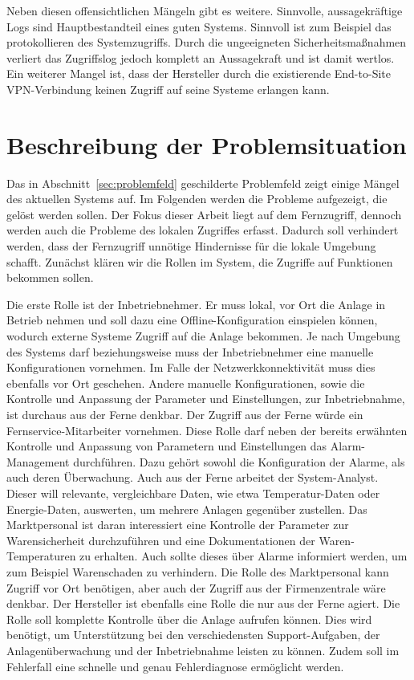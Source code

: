 \documentclass[11pt,a4paper]{report}
\begin{document}
Neben diesen offensichtlichen Mängeln gibt es weitere. Sinnvolle, aussagekräftige Logs sind Hauptbestandteil eines guten Systems. Sinnvoll ist zum Beispiel das protokollieren des Systemzugriffs. Durch die ungeeigneten Sicherheitsmaßnahmen verliert das Zugriffslog jedoch komplett an Aussagekraft und ist damit wertlos. Ein weiterer Mangel ist, dass der Hersteller durch die existierende End-to-Site VPN-Verbindung keinen Zugriff auf seine Systeme erlangen kann. 


\section{Beschreibung der Problemsituation}

Das in Abschnitt~\ref{sec:problemfeld} geschilderte Problemfeld zeigt einige Mängel des aktuellen Systems auf. Im Folgenden werden die Probleme aufgezeigt, die gelöst werden sollen. Der Fokus dieser Arbeit liegt auf dem Fernzugriff, dennoch werden auch die Probleme des lokalen Zugriffes erfasst. Dadurch soll verhindert werden, dass der Fernzugriff unnötige Hindernisse für die lokale Umgebung schafft. 
Zunächst klären wir die Rollen im System, die Zugriffe auf Funktionen bekommen sollen. 

Die erste Rolle ist der Inbetriebnehmer. Er muss lokal, vor Ort die Anlage in Betrieb nehmen und soll dazu eine Offline-Konfiguration einspielen können, wodurch externe Systeme Zugriff auf die Anlage bekommen. Je nach Umgebung des Systems darf beziehungsweise muss der Inbetriebnehmer eine manuelle Konfigurationen vornehmen. Im Falle der Netzwerkkonnektivität muss dies ebenfalls vor Ort geschehen. Andere manuelle Konfigurationen, sowie die Kontrolle und Anpassung der Parameter und Einstellungen, zur Inbetriebnahme, ist durchaus aus der Ferne denkbar. Der Zugriff aus der Ferne würde ein Fernservice-Mitarbeiter vornehmen. Diese Rolle darf neben der bereits erwähnten Kontrolle und Anpassung von Parametern und Einstellungen das Alarm-Management durchführen. Dazu gehört sowohl die Konfiguration der Alarme, als auch deren Überwachung. Auch aus der Ferne arbeitet der System-Analyst. Dieser will relevante, vergleichbare Daten, wie etwa Temperatur-Daten oder Energie-Daten, auswerten, um mehrere Anlagen gegenüber zustellen. Das Marktpersonal ist daran interessiert eine Kontrolle der Parameter zur Warensicherheit durchzuführen und eine Dokumentationen der Waren-Temperaturen zu erhalten. Auch sollte dieses über Alarme informiert werden, um zum Beispiel Warenschaden zu verhindern. Die Rolle des Marktpersonal kann Zugriff vor Ort benötigen, aber auch der Zugriff aus der Firmenzentrale wäre denkbar. Der Hersteller ist ebenfalls eine Rolle die nur aus der Ferne agiert. Die Rolle soll komplette Kontrolle über die Anlage aufrufen können. Dies wird benötigt, um Unterstützung bei den verschiedensten Support-Aufgaben, der Anlagenüberwachung und der Inbetriebnahme leisten zu können. Zudem soll im Fehlerfall eine schnelle und genau Fehlerdiagnose ermöglicht werden. 
\end{document}
